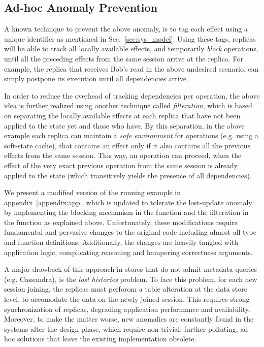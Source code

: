 %
\subsection{Ad-hoc Anomaly Prevention}
A known technique to prevent the above anomaly, 
is to tag each effect using a unique identifier  as mentioned in
Sec.~\ref{sec:sys_model}. Using these tags, replicas will be able to
track all locally available effects, and temporarily \emph{block}
operations, until all the preceding effects from the same session 
arrive at the replica. For example, the replica  that receives Bob's read
in the above undesired scenario, can simply postpone its execution until all
dependencies arrive.

In order to reduce the overhead of tracking dependencies per
operation, the above idea is further realized using another technique
called \emph{filteration}, which is based on separating the
locally available effects at each replica that have not been applied to
the state yet and those who have. By this separation, in the
above example each replica can
maintain a \emph{safe environment} for operations (e.g. using a soft-state
cache), that contains an effect only if it also contains all the
previous effects from the same session. This way, an operation 
can proceed, when the effect of the very exact previous operation from
the same session is already
applied to the state (which transitively yields the presence of all
dependencies).

We present a modified version of the running example
in appendix~\ref{appendix:app}, which is updated to
tolerate the lost-update anomaly by implementing the blocking mechanism
in the \readC{} function and the filteration in the \applyC{} function
as explained above. Unfortunately, these modifications require fundamental and pervasive
changes to the original code including almost all type and function
definitions.  
Additionally, the changes are heavily tangled with application logic, 
complicating reasoning and hampering correctness arguments.

A major drawback of this approach in
stores that do not admit metadata queries (e.g. Cassandra), 
is the \emph{lost histories}\cite{bolton} problem. To face this problem,
for each new session joining, the replicas must perforom a table
alteration at the data store level, to accomodate the data on the newly
joined session.  This  requires strong synchronization of
replicas, degrading application performance and availability.
Moreover, to make the matter worse, new anomalies are constantly
found in the
systems after the design phase, which require non-trivial, further polluting,  ad-hoc solutions
that leave the existing implementation obsolete.





